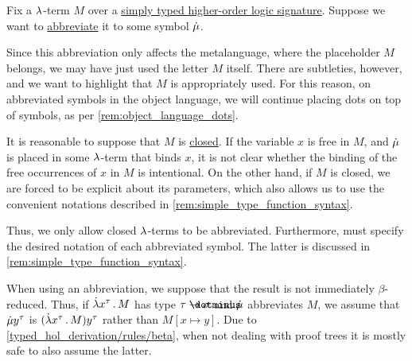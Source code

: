 \begin{remark}\label{rem:simply_typed_hol_abbreviations}
  Fix a \( {\mathrm \lambda} \)-term \( M \) over a \hyperref[def:simply_typed_hol_signature]{simply typed higher-order logic signature}. Suppose we want to \hyperref[con:metalingual_abbreviation]{abbreviate} it to some symbol \( \dot{\mu} \).

  Since this abbreviation only affects the metalanguage, where the placeholder \( M \) belongs, we may have just used the letter \( M \) itself. There are subtleties, however, and we want to highlight that \( M \) is appropriately used. For this reason, on abbreviated symbols in the object language, we will continue placing dots on top of symbols, as per \cref{rem:object_language_dots}.

  It is reasonable to suppose that \( M \) is \hyperref[def:lambda_combinator]{closed}. If the variable \( x \) is free in \( M \), and \( \dot{\mu} \) is placed in some \( {\mathrm \lambda} \)-term that binds \( x \), it is not clear whether the binding of the free occurrences of \( x \) in \( M \) is intentional. On the other hand, if \( M \) is closed, we are forced to be explicit about its parameters, which also allows us to use the convenient notations described in \cref{rem:simple_type_function_syntax}.

  Thus, we only allow closed \( {\mathrm \lambda} \)-terms to be abbreviated. Furthermore, must specify the desired notation of each abbreviated symbol. The latter is discussed in \cref{rem:simple_type_function_syntax}.

  When using an abbreviation, we suppose that the result is not immediately \( \beta \)-reduced. Thus, if \( \qabs {x^\tau} M \) has type \( \tau \synimplies \sigma \) and \( \dot{\mu} \) abbreviates \( M \), we assume that \( \dot{\mu} y^\tau \) is \( (\qabs {x^\tau} M) y^\tau \) rather than \( M[x \mapsto y] \). Due to \ref{typed_hol_derivation/rules/beta}, when not dealing with proof trees it is mostly safe to also assume the latter.
\end{remark}

